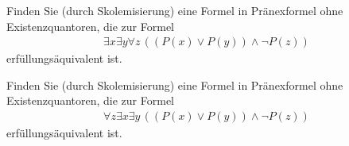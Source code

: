 
\begin{exercise}[173]
Finden Sie (durch Skolemisierung) eine Formel in Pränexformel ohne Existenzquantoren,
die zur Formel
\begin{align*}
  \exists x \exists y \forall z\, ((P(x) \lor P(y))\land \neg P(z))
\end{align*}
erfüllungsäquivalent ist.
\end{exercise}


\begin{solution}
\phantom{}
\end{solution}



\begin{exercise}[174]
Finden Sie (durch Skolemisierung) eine Formel in Pränexformel ohne Existenzquantoren,
die zur Formel
\begin{align*}
  \forall z \exists x \exists y \, ((P(x) \lor P(y))\land \neg P(z))
\end{align*}
erfüllungsäquivalent ist.
\end{exercise}


\begin{solution}
\phantom{}
\end{solution}

